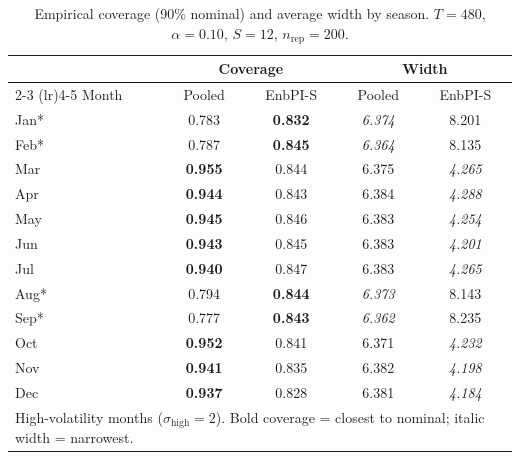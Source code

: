\begin{table}[ht]
\centering
\caption{Empirical coverage (90\% nominal) and average width by season.
$T=480$, $\alpha=0.10$, $S=12$, $n_{\mathrm{rep}}=200$.}
\label{tab:e1_coverage_T480}
\begin{tabular}{l cc cc}
\toprule
 & \multicolumn{2}{c}{Coverage} & \multicolumn{2}{c}{Width} \\
\cmidrule(lr){2-3} \cmidrule(lr){4-5}
Month & Pooled & EnbPI-S & Pooled & EnbPI-S \\
\midrule
Jan* & 0.783 & \textbf{0.832} & \textit{6.374} & 8.201 \\
Feb* & 0.787 & \textbf{0.845} & \textit{6.364} & 8.135 \\
Mar & \textbf{0.955} & 0.844 & 6.375 & \textit{4.265} \\
Apr & \textbf{0.944} & 0.843 & 6.384 & \textit{4.288} \\
May & \textbf{0.945} & 0.846 & 6.383 & \textit{4.254} \\
Jun & \textbf{0.943} & 0.845 & 6.383 & \textit{4.201} \\
Jul & \textbf{0.940} & 0.847 & 6.383 & \textit{4.265} \\
Aug* & 0.794 & \textbf{0.844} & \textit{6.373} & 8.143 \\
Sep* & 0.777 & \textbf{0.843} & \textit{6.362} & 8.235 \\
Oct & \textbf{0.952} & 0.841 & 6.371 & \textit{4.232} \\
Nov & \textbf{0.941} & 0.835 & 6.382 & \textit{4.198} \\
Dec & \textbf{0.937} & 0.828 & 6.381 & \textit{4.184} \\
\bottomrule
\multicolumn{5}{l}{\footnotesize * High-volatility months ($\sigma_{\mathrm{high}}=2$).  Bold coverage = closest to nominal; italic width = narrowest.}\\
\end{tabular}
\end{table}